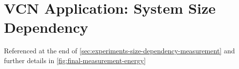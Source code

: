 \newpage
{}
\newpage
\begin{minipage}{\textwidth}
    \section{VCN Application: System Size Dependency} %
        \label{appendix:vcn-system-size-dependency}
        Referenced at the end of \autoref{sec:experiments-size-dependency-measurement} and further details in \autoref{fig:final-measurement-energy}\\
        \vbox{
        }
\end{minipage}
\newpage
\begin{minipage}{\textwidth}
    \vbox{
    }
\end{minipage}

